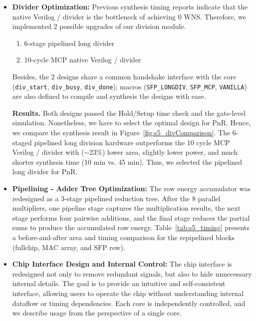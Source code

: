 \documentclass[journal]{IEEEtran}
\begin{document}
\begin{itemize}
    \item \textbf{Divider Optimization:}
    Previous synthesis timing reports indicate that the native Verilog / divider is the bottleneck of achieving 0 WNS. 
    Therefore, we implemented 2 possible upgrades of our division module. 
    \begin{enumerate}
    \item 6-stage pipelined long divider
    \item 10-cycle MCP native Verilog / divider
    \end{enumerate}
    Besides, the 2 designs share a common handshake interface with the core (\texttt{div\_start}, \texttt{div\_busy}, \texttt{div\_done}); macros (\texttt{SFP\_LONGDIV}, \texttt{SFP\_MCP}, \texttt{VANILLA}) are also defined to compile and synthesis the designs with ease.
    
    \textbf{Results.} 
    Both designs passed the Hold/Setup time check and the gate-level simulation. Nonetheless, we have to select the optimal design for PnR. Hence, we compare the synthesis result in Figure~\ref{fig:s5_divComparison}. 
    The 6-staged pipelined long division hardware outperforms the 10 cycle MCP Verilog / divider with ($\sim$23\%) lower area, slightly lower power, and much shorter synthesis time (10 min vs. 45 min).
    Thus, we selected the pipelined long divider for PnR.
    



    \item \textbf{Pipelining - Adder Tree Optimization:} The row energy accumulator was redesigned as a 3-stage pipelined reduction tree. After the 8 parallel multipliers, one pipeline stage captures the multiplication results, the next stage performs four pairwise additions, and the final stage reduces the partial sums to produce the accumulated row energy. Table~\ref{tab:s5_timing} presents a before-and-after area and timing comparison for the repipelined blocks (fullchip, MAC array, and SFP row).

    \item \textbf{Chip Interface Design and Internal Control:} 
    The chip interface is redesigned not only to remove redundant signals, but also to hide unnecessary internal details. The goal is to provide an intuitive and self-consistent interface, allowing users to operate the chip without understanding internal dataflow or timing dependencies. Each core is independently controlled, and we describe usage from the perspective of a single core.
    


\end{itemize}
\end{document}
